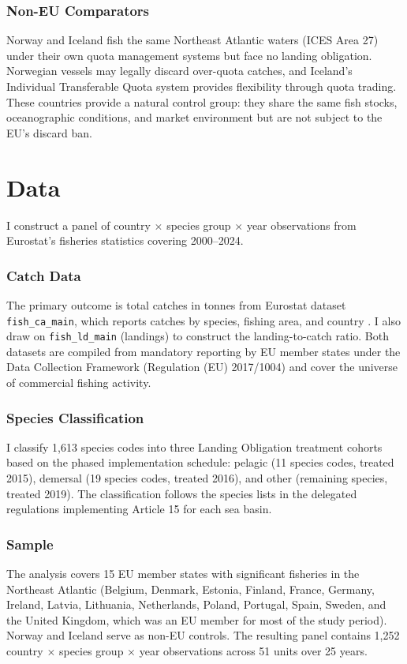 \documentclass[12pt]{article}
\begin{document}
\subsubsection*{Non-EU Comparators} Norway and Iceland fish the same Northeast Atlantic waters (ICES Area 27) under their own quota management systems but face no landing obligation. Norwegian vessels may legally discard over-quota catches, and Iceland's Individual Transferable Quota system provides flexibility through quota trading. These countries provide a natural control group: they share the same fish stocks, oceanographic conditions, and market environment but are not subject to the EU's discard ban.


\section{Data}

I construct a panel of country $\times$ species group $\times$ year observations from Eurostat's fisheries statistics covering 2000--2024.

\subsubsection*{Catch Data} The primary outcome is total catches in tonnes from Eurostat dataset \texttt{fish\_ca\_main}, which reports catches by species, fishing area, and country \citep{eurostat2024fisheries}. I also draw on \texttt{fish\_ld\_main} (landings) to construct the landing-to-catch ratio. Both datasets are compiled from mandatory reporting by EU member states under the Data Collection Framework (Regulation (EU) 2017/1004) and cover the universe of commercial fishing activity.

\subsubsection*{Species Classification} I classify 1,613 species codes into three Landing Obligation treatment cohorts based on the phased implementation schedule: pelagic (11 species codes, treated 2015), demersal (19 species codes, treated 2016), and other (remaining species, treated 2019). The classification follows the species lists in the delegated regulations implementing Article 15 for each sea basin.

\subsubsection*{Sample} The analysis covers 15 EU member states with significant fisheries in the Northeast Atlantic (Belgium, Denmark, Estonia, Finland, France, Germany, Ireland, Latvia, Lithuania, Netherlands, Poland, Portugal, Spain, Sweden, and the United Kingdom, which was an EU member for most of the study period). Norway and Iceland serve as non-EU controls. The resulting panel contains 1,252 country $\times$ species group $\times$ year observations across 51 units over 25 years.
\end{document}
